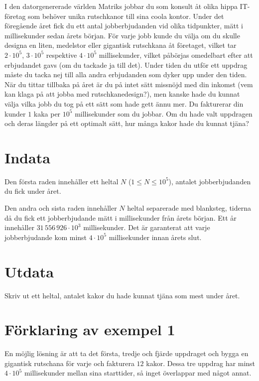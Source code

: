 I den datorgenererade världen Matriks jobbar du som konsult åt olika hippa IT-företag som behöver unika rutschkanor till sina coola kontor.
Under det föregående året fick du ett antal jobberbjudanden vid olika tidpunkter, mätt i millisekunder sedan årets början.
För varje jobb kunde du välja om du skulle designa en liten, medelstor eller gigantisk rutschkana åt företaget, vilket tar $2 \cdot 10^5$, $3 \cdot 10^5$ respektive $4 \cdot 10^5$ millisekunder, vilket påbörjas omedelbart efter att erbjudandet gavs (om du tackade ja till det).
Under tiden du utför ett uppdrag måste du tacka nej till alla andra erbjudanden som dyker upp under den tiden.
När du tittar tillbaka på året är du på intet sätt missnöjd med din inkomst (vem kan klaga på att jobba med rutschkanedesign?), men kanske hade du kunnat välja vilka jobb du tog på ett sätt som hade gett ännu mer.
Du fakturerar din kunder $1$ kaka per $10^5$ millisekunder som du jobbar.
Om du hade valt uppdragen och deras längder på ett optimalt sätt, hur många kakor hade du kunnat tjäna?


\section*{Indata}
Den första raden innehåller ett heltal $N$ ($1 \le N \le 10^5$), antalet jobberbjudanden du fick under året.

Den andra och sista raden innehåller $N$ heltal separerade med blanksteg, tiderna då du fick ett jobberbjudande mätt i millisekunder från årets början.
Ett år innehåller $31\,556\,926 \cdot 10^3$ millisekunder.
Det är garanterat att varje jobberbjudande kom minst $4 \cdot 10^5$ millisekunder innan årets slut.

\section*{Utdata}
Skriv ut ett heltal, antalet kakor du hade kunnat tjäna som mest under året.

\section*{Förklaring av exempel 1}
En möjlig lösning är att ta det första, tredje och fjärde uppdraget och bygga en gigantisk rutschana för varje och fakturera $12$ kakor.
Dessa tre uppdrag har minst $4 \cdot 10^5$ millisekunder mellan sina starttider, så inget överlappar med något annat.
